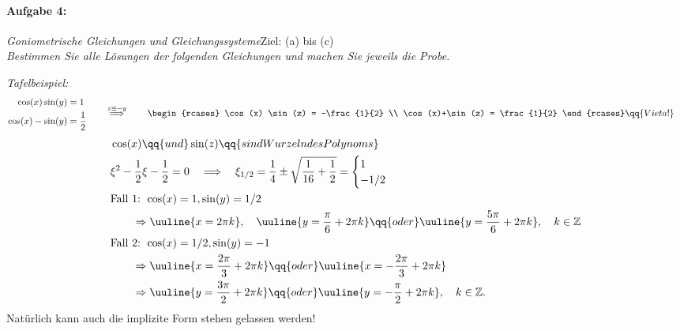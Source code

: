 \paragraph{Aufgabe 4: } \emph{Goniometrische Gleichungen und Gleichungssysteme}\hfill Ziel: (a) bis (c)\\[0.2cm]
\emph{Bestimmen Sie alle Lösungen der folgenden Gleichungen und machen Sie jeweils die Probe.}

\emph{Tafelbeispiel:}
\begin{align}
    &\begin{split}
        \cos(x) \sin(y) &= 1 \\
        \cos(x) - \sin(y) &= \frac{1}{2}
    \end{split} \qquad \overset{z \equiv -y}{\Longrightarrow} \qquad \begin{rcases}
        \cos(x) \sin(z) = -\frac{1}{2} \\
        \cos(x)+\sin(z) = \frac{1}{2}
    \end{rcases} \qq{Vieta!}
\end{align}
\begin{align}
    &\cos(x) \qq{und} \sin(z) \qq{sind Wurzeln des Polynoms} \\
    & \xi^2 - \frac{1}{2}\xi - \frac{1}{2} = 0 \quad \Longrightarrow \quad \xi_{1/2} = \frac{1}{4}\pm \sqrt{\frac{1}{16}+\frac{1}{2}} = \begin{cases}
        1 \\ -1/2
    \end{cases} \\
    & \text{Fall 1: } \cos(x)  =1, \sin(y) = 1/2 \\
    & \qquad \Rightarrow \uuline{x= 2\pi k}, \quad \uuline{y = \frac{\pi}{6} + 2\pi k} \qq{oder} \uuline{y = \frac{5\pi}{6} + 2\pi k}, \quad k \in \mathbb{Z} \\
    &\text{Fall 2: } \cos(x) = 1/2, \sin(y) = -1 \\
    & \qquad \Rightarrow \uuline{x = \frac{2\pi}{3} + 2\pi k} \qq{oder} \uuline{x =-\frac{2\pi}{3} + 2\pi k} \\
    & \qquad \Rightarrow \uuline{y = \frac{3\pi}{2} + 2\pi k} \qq{oder} \uuline{y = -\frac{\pi}{2}+2\pi k}, \quad k \in \mathbb{Z}.
\end{align}
Natürlich kann auch die implizite Form stehen gelassen werden!

